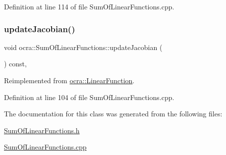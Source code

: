 Definition at line 114 of file Sum\+Of\+Linear\+Functions.\+cpp.

\hypertarget{classocra_1_1SumOfLinearFunctions_a4597593267a02c2087ea84a327eae5dc}{}\label{classocra_1_1SumOfLinearFunctions_a4597593267a02c2087ea84a327eae5dc} 
\subsubsection{\texorpdfstring{update\+Jacobian()}{updateJacobian()}}
{\footnotesize\ttfamily void ocra\+::\+Sum\+Of\+Linear\+Functions\+::update\+Jacobian (\begin{DoxyParamCaption}{ }\end{DoxyParamCaption}) const\hspace{0.3cm}{\ttfamily [protected]}, {\ttfamily [virtual]}}



Reimplemented from \hyperlink{classocra_1_1LinearFunction_a30926f977c0124a0b0f65b854ab39636}{ocra\+::\+Linear\+Function}.



Definition at line 104 of file Sum\+Of\+Linear\+Functions.\+cpp.



The documentation for this class was generated from the following files\+:\begin{DoxyCompactItemize}
\item 
\hyperlink{SumOfLinearFunctions_8h}{Sum\+Of\+Linear\+Functions.\+h}\item 
\hyperlink{SumOfLinearFunctions_8cpp}{Sum\+Of\+Linear\+Functions.\+cpp}\end{DoxyCompactItemize}

